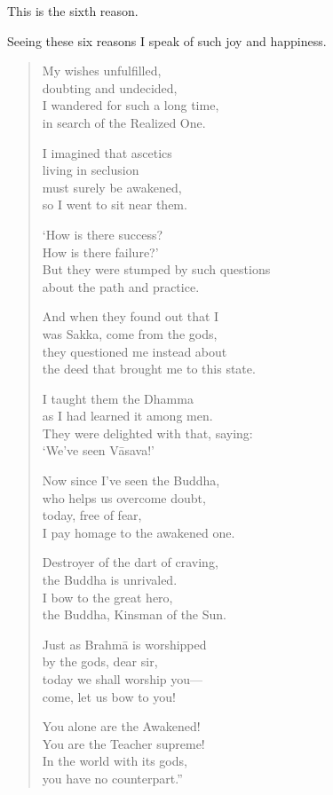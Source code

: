 \documentclass[12pt,openany]{book}%
\begin{document}
This is the sixth reason. 

Seeing these six reasons I speak of such joy and happiness. 

\begin{verse}%
My wishes unfulfilled, \\
doubting and undecided, \\
I wandered for such a long time, \\
in search of the Realized One. 

I imagined that ascetics \\
living in seclusion \\
must surely be awakened, \\
so I went to sit near them. 

‘How is there success? \\
How is there failure?’ \\
But they were stumped by such questions \\
about the path and practice. 

And when they found out that I \\
was Sakka, come from the gods, \\
they questioned me instead about \\
the deed that brought me to this state. 

I taught them the Dhamma \\
as I had learned it among men. \\
They were delighted with that, saying: \\
‘We’ve seen \textsanskrit{Vāsava}!’ 

Now since I’ve seen the Buddha, \\
who helps us overcome doubt, \\
today, free of fear, \\
I pay homage to the awakened one. 

Destroyer of the dart of craving, \\
the Buddha is unrivaled. \\
I bow to the great hero, \\
the Buddha, Kinsman of the Sun. 

Just as \textsanskrit{Brahmā} is worshipped \\
by the gods, dear sir, \\
today we shall worship you—\\
come, let us bow to you! 

You alone are the Awakened! \\
You are the Teacher supreme! \\
In the world with its gods, \\
you have no counterpart.” 

%
\end{verse}
\end{document}
